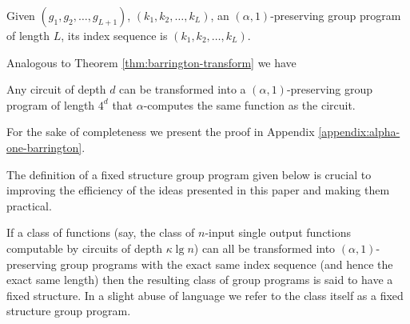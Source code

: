 \begin{definition}
  Given  $(g_1, g_2,\ldots,  g_{L+1})$, $(k_1,  k_2,\ldots,  k_L)$, an
  $(\alpha,1)$-preserving  group  program  of  length  $L$,  its  index
  sequence is $(k_1, k_2,\ldots, k_L)$.
\end{definition}

Analogous   to   Theorem   \ref{thm:barrington-transform} we have

\begin{theorem} 
\label{thm:alpha-one-barrington-transform}
Any   circuit    of   depth   $d$   can   be    transformed   into   a
$(\alpha,1)$-preserving   group  program   of   length  $4^{d}$   that
$\alpha$-computes the same function as the circuit.
\end{theorem}

For  the  sake  of  completeness  we present  the  proof  in  Appendix
\ref{appendix:alpha-one-barrington}. 

The  definition of  a  fixed structure group  program  given below  is
crucial to  improving the  efficiency of the  ideas presented  in this
paper and making them practical.

\begin{definition}
\label{def:fixed-structure}
  If a class  of functions (say, the class  of $n$-input single output
  functions computable by circuits of  depth $\kappa\lg n$) can all be
  transformed  into $(\alpha,1)$-preserving  group  programs with  the
  exact same index sequence (and hence the exact same length) then the
  resulting  class  of  group  programs   is  said  to  have  a  fixed
  structure.  In a  slight abuse  of language  we refer  to  the class
  itself as a fixed structure group program.
\end{definition}